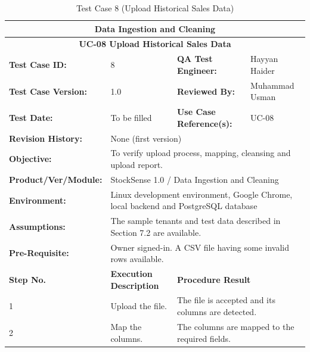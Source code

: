 \documentclass{StockSense}
\begin{document}
\begin{table}[!htbp]
\centering
\caption{Test Case 8 (Upload Historical Sales Data)}
{\small\linespread{1}\selectfont\renewcommand{\arraystretch}{1.25}
\begin{tabular}{|p{}|p{}|p{}|p{}|}
\hline
\multicolumn{4}{|c|}{\textbf{Data Ingestion and Cleaning}} \\ \hline
\multicolumn{4}{|c|}{\textbf{UC-08 Upload Historical Sales Data}} \\ \hline
\textbf{Test Case ID:} & 8 & \textbf{QA Test Engineer:} & Hayyan Haider \\ \hline
\textbf{Test Case Version:} & 1.0 & \textbf{Reviewed By:} & Muhammad Usman \\ \hline
\textbf{Test Date:} & To be filled & \textbf{Use Case Reference(s):} & UC-08 \\ \hline
\textbf{Revision History:} & \multicolumn{3}{p{\dimexpr0.70\textwidth+4\tabcolsep\relax}|}{None (first version)} \\ \hline
\textbf{Objective:} & \multicolumn{3}{p{\dimexpr0.70\textwidth+4\tabcolsep\relax}|}{To verify upload process, mapping, cleansing and upload report.} \\ \hline
\textbf{Product/Ver/Module:} & \multicolumn{3}{p{\dimexpr0.70\textwidth+4\tabcolsep\relax}|}{StockSense 1.0 / Data Ingestion and Cleaning} \\ \hline
\textbf{Environment:} & \multicolumn{3}{p{\dimexpr0.70\textwidth+4\tabcolsep\relax}|}{Linux development environment, Google Chrome, local backend and PostgreSQL database} \\ \hline
\textbf{Assumptions:} & \multicolumn{3}{p{\dimexpr0.70\textwidth+4\tabcolsep\relax}|}{The sample tenants and test data described in Section 7.2 are available.} \\ \hline
\textbf{Pre-Requisite:} & \multicolumn{3}{p{\dimexpr0.70\textwidth+4\tabcolsep\relax}|}{Owner signed-in. A CSV file having some invalid rows available.} \\ \hline
\textbf{Step No.} & \textbf{Execution Description} & \multicolumn{2}{l|}{\textbf{Procedure Result}} \\ \hline
1 & Upload the file. & \multicolumn{2}{p{\dimexpr0.42\textwidth+2\tabcolsep\relax}|}{The file is accepted and its columns are detected.} \\ \hline
2 & Map the columns. & \multicolumn{2}{p{\dimexpr0.42\textwidth+2\tabcolsep\relax}|}{The columns are mapped to the required fields.} \\ \hline

\end{tabular}}
\end{table}
\end{document}

